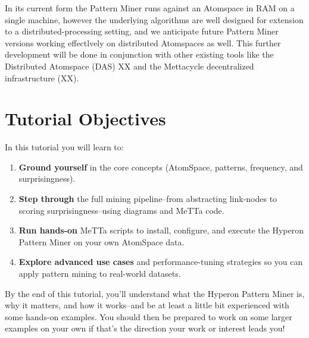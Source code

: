 \documentclass{article}
\begin{document}
In its current form the Pattern Miner runs against an Atomspace in RAM on a single machine, however the underlying algorithms are well designed for extension to a distributed-processing setting, and we anticipate future Pattern Miner versions working effectlvely on distributed Atomspaces as well.   This further development will be done in conjunction with other existing tools like the Distributed Atomspace (DAS) XX and the Mettacycle decentralized infrastructure (XX).

\section{Tutorial Objectives}

In this tutorial you will learn to:

\begin{enumerate}
  \item \textbf{Ground yourself} in the core concepts (AtomSpace, patterns, frequency, and surprisingness).
  \item \textbf{Step through} the full mining pipeline--from abstracting link-nodes to scoring surprisingness--using diagrams and MeTTa code.
  \item \textbf{Run hands-on} MeTTa scripts to install, configure, and execute the Hyperon Pattern Miner on your own AtomSpace data.
  \item \textbf{Explore advanced use cases} and performance-tuning strategies so you can apply pattern mining to real-world datasets.
\end{enumerate}

By the end of this tutorial, you'll understand what the Hyperon Pattern Miner is, why it matters, and how it works--and be at least a little bit experienced with some hands-on examples.   You should then be prepared to work on some larger examples on your own if that's the direction your work or interest leads you!
\end{document}
